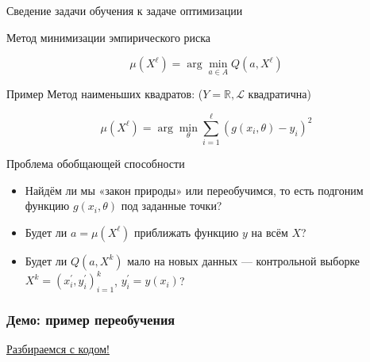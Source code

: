 \documentclass[fullscreen=true, bookmarks=true, hyperref={pdfencoding=unicode}]{beamer}
\begin{document}
\begin{frame}{Сведение задачи обучения к задаче оптимизации}

  Метод минимизации эмпирического риска

  $$\mu(X^\ell) = \arg\min\limits_{a \in A} Q(a, X^\ell)$$

  \begin{block}{Пример}
    Метод наименьших квадратов: ($Y = \mathbb{R}, \mathcal{L}$ квадратична)

    $$\mu(X^\ell) = \arg\min\limits_{\theta} \sum\limits_{i=1}^{\ell} (g(x_i, \theta) - y_i)^2$$
  \end{block}


  \begin{block}{Проблема обобщающей способности}
    \begin{itemize}
      \item Найдём ли мы «закон природы» или переобучимся, то есть подгоним функцию $g(x_i, \theta)$ под заданные точки?
      \item Будет ли $a = \mu(X^\ell)$ приближать функцию $y$ на всём $X$?
      \item Будет ли $Q(a, X^k)$ мало на новых данных — контрольной выборке $X^k = (x_i^\prime, y_i^\prime)_{i=1}^k$, $y_i^\prime = y(x_i)$?
    \end{itemize}
  \end{block}

\end{frame}

\begin{frame}
  \frametitle{Демо: пример переобучения}

  \href{https://github.com/avalur/yandex-practice-2022/blob/main/01_intro/01_demo_overfitting.ipynb}{Разбираемся с кодом!}
\end{frame}
\end{document}
